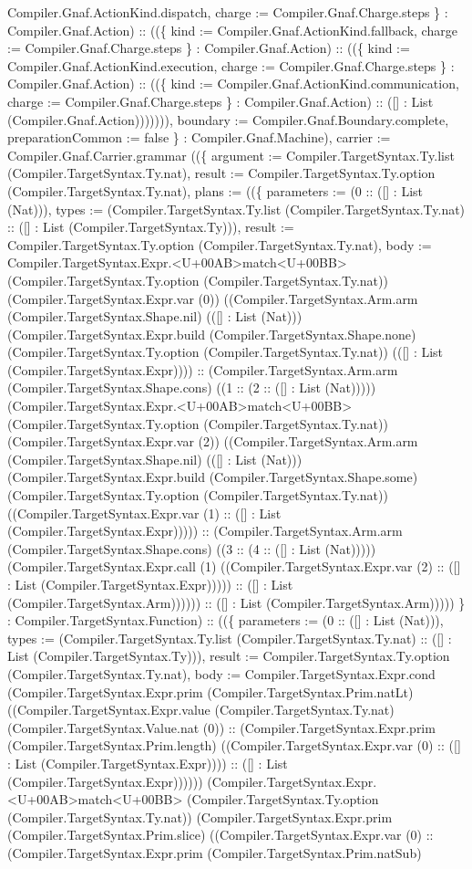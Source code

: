 \documentclass[11pt]{article}
\begin{document}
Compiler.Gnaf.ActionKind.dispatch, charge := Compiler.Gnaf.Charge.steps \} : Compiler.Gnaf.Action) :: ((\{ kind := Compiler.Gnaf.ActionKind.fallback, charge := Compiler.Gnaf.Charge.steps \} : Compiler.Gnaf.Action) :: ((\{ kind := Compiler.Gnaf.ActionKind.execution, charge := Compiler.Gnaf.Charge.steps \} : Compiler.Gnaf.Action) :: ((\{ kind := Compiler.Gnaf.ActionKind.communication, charge := Compiler.Gnaf.Charge.steps \} : Compiler.Gnaf.Action) :: ([] : List (Compiler.Gnaf.Action))))))), boundary := Compiler.Gnaf.Boundary.complete, preparationCommon := false \} : Compiler.Gnaf.Machine), carrier := Compiler.Gnaf.Carrier.grammar ((\{ argument := Compiler.TargetSyntax.Ty.list (Compiler.TargetSyntax.Ty.nat), result := Compiler.TargetSyntax.Ty.option (Compiler.TargetSyntax.Ty.nat), plans := ((\{ parameters := (0 :: ([] : List (Nat))), types := (Compiler.TargetSyntax.Ty.list (Compiler.TargetSyntax.Ty.nat) :: ([] : List (Compiler.TargetSyntax.Ty))), result := Compiler.TargetSyntax.Ty.option (Compiler.TargetSyntax.Ty.nat), body := Compiler.TargetSyntax.Expr.<U+00AB>match<U+00BB> (Compiler.TargetSyntax.Ty.option (Compiler.TargetSyntax.Ty.nat)) (Compiler.TargetSyntax.Expr.var (0)) ((Compiler.TargetSyntax.Arm.arm (Compiler.TargetSyntax.Shape.nil) (([] : List (Nat))) (Compiler.TargetSyntax.Expr.build (Compiler.TargetSyntax.Shape.none) (Compiler.TargetSyntax.Ty.option (Compiler.TargetSyntax.Ty.nat)) (([] : List (Compiler.TargetSyntax.Expr)))) :: (Compiler.TargetSyntax.Arm.arm (Compiler.TargetSyntax.Shape.cons) ((1 :: (2 :: ([] : List (Nat))))) (Compiler.TargetSyntax.Expr.<U+00AB>match<U+00BB> (Compiler.TargetSyntax.Ty.option (Compiler.TargetSyntax.Ty.nat)) (Compiler.TargetSyntax.Expr.var (2)) ((Compiler.TargetSyntax.Arm.arm (Compiler.TargetSyntax.Shape.nil) (([] : List (Nat))) (Compiler.TargetSyntax.Expr.build (Compiler.TargetSyntax.Shape.some) (Compiler.TargetSyntax.Ty.option (Compiler.TargetSyntax.Ty.nat)) ((Compiler.TargetSyntax.Expr.var (1) :: ([] : List (Compiler.TargetSyntax.Expr))))) :: (Compiler.TargetSyntax.Arm.arm (Compiler.TargetSyntax.Shape.cons) ((3 :: (4 :: ([] : List (Nat))))) (Compiler.TargetSyntax.Expr.call (1) ((Compiler.TargetSyntax.Expr.var (2) :: ([] : List (Compiler.TargetSyntax.Expr))))) :: ([] : List (Compiler.TargetSyntax.Arm)))))) :: ([] : List (Compiler.TargetSyntax.Arm))))) \} : Compiler.TargetSyntax.Function) :: ((\{ parameters := (0 :: ([] : List (Nat))), types := (Compiler.TargetSyntax.Ty.list (Compiler.TargetSyntax.Ty.nat) :: ([] : List (Compiler.TargetSyntax.Ty))), result := Compiler.TargetSyntax.Ty.option (Compiler.TargetSyntax.Ty.nat), body := Compiler.TargetSyntax.Expr.cond (Compiler.TargetSyntax.Expr.prim (Compiler.TargetSyntax.Prim.natLt) ((Compiler.TargetSyntax.Expr.value (Compiler.TargetSyntax.Ty.nat) (Compiler.TargetSyntax.Value.nat (0)) :: (Compiler.TargetSyntax.Expr.prim (Compiler.TargetSyntax.Prim.length) ((Compiler.TargetSyntax.Expr.var (0) :: ([] : List (Compiler.TargetSyntax.Expr)))) :: ([] : List (Compiler.TargetSyntax.Expr)))))) (Compiler.TargetSyntax.Expr.<U+00AB>match<U+00BB> (Compiler.TargetSyntax.Ty.option (Compiler.TargetSyntax.Ty.nat)) (Compiler.TargetSyntax.Expr.prim (Compiler.TargetSyntax.Prim.slice) ((Compiler.TargetSyntax.Expr.var (0) :: (Compiler.TargetSyntax.Expr.prim (Compiler.TargetSyntax.Prim.natSub) 
\end{document}
